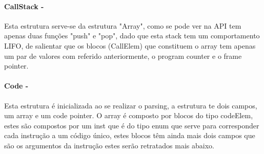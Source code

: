 \documentclass{report}
\begin{document}
\noindent
\par
\begin{Parallel}[v]{0.48\textwidth}{0.48\textwidth}
\ParallelPar
\end{Parallel}

\paragraph{\quad CallStack - } Esta estrutura serve-se da estrutura "Array", como se pode ver na API tem apenas duas funções
 "push" e "pop", dado que esta stack tem um comportamento LIFO, de salientar que os blocos (CallElem) que constituem
 o array tem apenas um par de valores com referido anteriormente, o program counter e o frame pointer.

\noindent
\par
\begin{Parallel}[v]{0.48\textwidth}{0.48\textwidth}
\ParallelPar
\end{Parallel}

\paragraph{\quad Code - } Esta estrutura é inicializada ao se realizar o parsing, a estrutura te dois campos,
 um array e um code pointer. O array é composto por blocos do tipo codeElem, estes são compostos por um
 inst que é do tipo enum que serve para corresponder cada instrução a um código único, estes blocos têm ainda
	mais dois campos que são os argumentos da instrução estes serão retratados mais abaixo.
\end{document}
